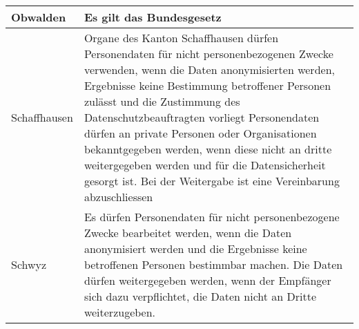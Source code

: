 \begin{longtable}{| p{} | p{}|}
		\hline
		Obwalden & Es gilt das Bundesgesetz \parencite{DSSGOW} \\
		\hline
		Schaffhausen & Organe des Kanton Schaffhausen dürfen Personendaten für nicht personenbezogenen Zwecke verwenden, wenn die Daten anonymisierten werden, Ergebnisse keine Bestimmung betroffener Personen zulässt und die Zustimmung des Datenschutzbeauftragten vorliegt \parencite[§§ 12 Abs. 1]{DSSGSH} Personendaten dürfen an private Personen oder Organisationen bekanntgegeben werden, wenn diese nicht an dritte weitergegeben werden und für die Datensicherheit gesorgt ist. Bei der Weitergabe ist eine Vereinbarung abzuschliessen \parencite[§§ 12 Abs 2]{DSSGSH} \\
		\hline
    Schwyz & Es dürfen Personendaten für nicht personenbezogene Zwecke bearbeitet werden, wenn die Daten anonymisiert werden und die Ergebnisse keine betroffenen Personen bestimmbar machen. Die Daten dürfen weitergegeben werden, wenn der Empfänger sich dazu verpflichtet, die Daten nicht an Dritte weiterzugeben. \parencite[§§ 14 Abs 1-2]{DSSGSZ} \\


\end{longtable}
